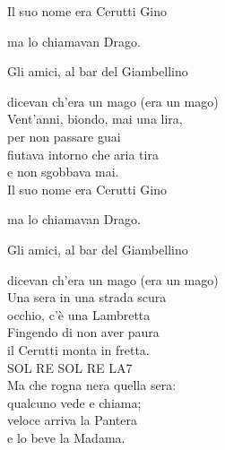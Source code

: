 \documentclass[10pt, twoside, a4paper]{article}
\begin{document}
\begin{multicols}{2}

\hspace{8pt} Il suo nome era Cerutti Gino

\hspace{8pt} ma lo chiamavan Drago.

\hspace{8pt} Gli amici, al bar del Giambellino

\hspace{8pt} dicevan ch'era un mago (era un mago)\hspace{8pt}\\

Vent'anni, biondo, mai una lira,\\
per non passare guai\\
fiutava intorno che aria tira\\
e non sgobbava mai.\\

\hspace{8pt} Il suo nome era Cerutti Gino

\hspace{8pt} ma lo chiamavan Drago.

\hspace{8pt} Gli amici, al bar del Giambellino

\hspace{8pt} dicevan ch'era un mago (era un mago)\\

Una sera in una strada scura\\
occhio, c'è una Lambretta\\
Fingendo di non aver paura\\
il Cerutti monta in fretta.\\

SOL\hspace{10pt} RE\hspace{10pt} SOL\hspace{10pt} RE\hspace{10pt} LA7\\

Ma che rogna nera quella sera:\\
qualcuno vede e chiama;\\
veloce arriva la Pantera\\
e lo beve la Madama.\\
\columnbreak


\end{multicols}
\end{document}

